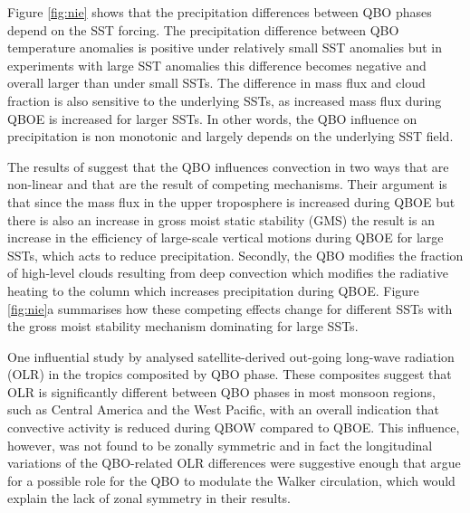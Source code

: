  Figure \ref{fig:nie} shows that the precipitation differences between QBO phases depend on the SST forcing.   The precipitation difference between QBO temperature anomalies is positive under relatively small SST anomalies but in experiments with large SST anomalies this difference becomes negative and overall larger than under small SSTs. The difference in mass flux and cloud fraction is also sensitive to the underlying SSTs, as increased mass flux during QBOE is increased for larger SSTs.  In other words, the QBO influence on precipitation is non monotonic and largely depends on the underlying SST field.
 
  The results of \cite{nie2015} suggest that the QBO influences convection in two ways that are non-linear and that are the result of competing mechanisms. Their argument is that since  the mass flux in the upper troposphere is increased during QBOE but there is also an increase in gross moist static stability (GMS) the result is an increase in the efficiency of large-scale vertical motions during QBOE for large SSTs, which acts to reduce precipitation.  Secondly, the QBO modifies the fraction of high-level clouds resulting from deep convection which modifies the radiative heating to the column which increases precipitation during QBOE.  Figure \ref{fig:nie}a summarises how these competing effects change for different SSTs with the gross moist stability mechanism dominating for large SSTs. 

One influential study by \cite{collimore2003} analysed satellite-derived out-going long-wave radiation (OLR) in the tropics composited by QBO phase. These composites suggest that OLR is significantly different between QBO phases in most monsoon regions, such as Central America  and the West Pacific, with an overall indication that convective activity is reduced during QBOW compared to QBOE. This influence, however, was not found to be zonally symmetric and in fact the longitudinal variations of the QBO-related OLR differences were suggestive enough that \cite{collimore2003} argue for a possible role for the QBO to modulate the Walker circulation, which would explain the lack of zonal symmetry in their results. 

